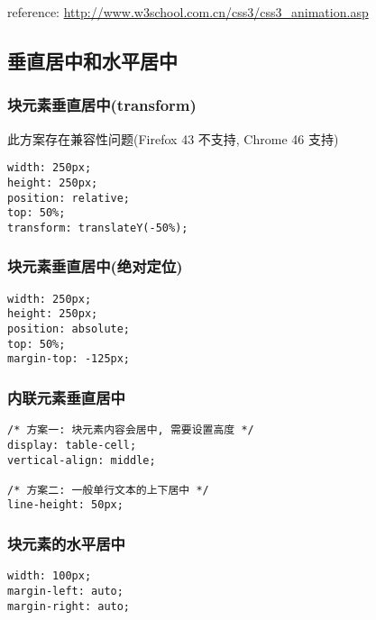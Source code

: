 reference: \url{http://www.w3school.com.cn/css3/css3_animation.asp}

\subsection{垂直居中和水平居中}\label{ux5782ux76f4ux5c45ux4e2dux548cux6c34ux5e73ux5c45ux4e2d}

\subsubsection{块元素垂直居中(transform)}\label{ux5757ux5143ux7d20ux5782ux76f4ux5c45ux4e2dtransform}

此方案存在兼容性问题(Firefox 43 不支持, Chrome 46 支持)

\begin{lstlisting}
width: 250px;
height: 250px;
position: relative;
top: 50%;
transform: translateY(-50%);
\end{lstlisting}

\subsubsection{块元素垂直居中(绝对定位)}\label{ux5757ux5143ux7d20ux5782ux76f4ux5c45ux4e2dux7eddux5bf9ux5b9aux4f4d}

\begin{lstlisting}
width: 250px;
height: 250px;
position: absolute;
top: 50%;
margin-top: -125px;
\end{lstlisting}

\subsubsection{内联元素垂直居中}\label{ux5185ux8054ux5143ux7d20ux5782ux76f4ux5c45ux4e2d}

\begin{lstlisting}
/* 方案一: 块元素内容会居中, 需要设置高度 */
display: table-cell;
vertical-align: middle;

/* 方案二: 一般单行文本的上下居中 */
line-height: 50px;
\end{lstlisting}

\subsubsection{块元素的水平居中}\label{ux5757ux5143ux7d20ux7684ux6c34ux5e73ux5c45ux4e2d}

\begin{lstlisting}
width: 100px;
margin-left: auto;
margin-right: auto;
\end{lstlisting}

